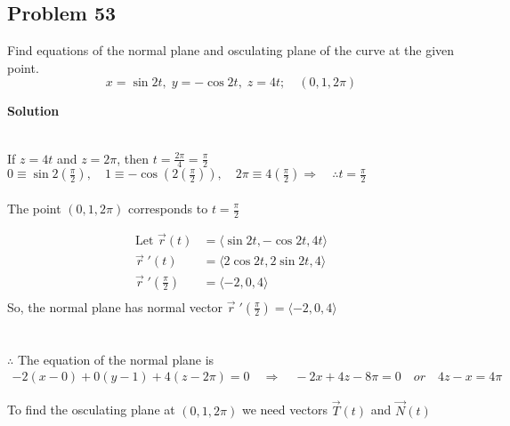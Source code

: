 \documentclass{article}
\newcommand\vv[1]{\langle #1 \rangle}
\newcommand\vc[2]{\vec{#1}(#2)}
\newcommand\vcd[2]{\vec{#1}\;'(#2)}
\newcommand\rr{\quad\Rightarrow\quad}
\begin{document}
\subsection*{Problem 53}

Find equations of the normal plane and osculating plane of the curve at the given point.
\[
    x = \sin{2t},\; y = -\cos{2t},\; z = 4t; \quad (0, 1, 2\pi)
\]

\centerline{\textbf{Solution}} \\
If $z = 4t$ and $z = 2\pi$, then $t = \frac{2\pi}{4} = \frac \pi 2$ \\
$0 \equiv \sin{2(\frac \pi 2)}, \quad 1 \equiv -\cos(2(\frac \pi 2)), \quad 2\pi \equiv 4(\frac \pi 2) \Rightarrow \quad \therefore t = \frac \pi 2$ \\
\\
The point $(0, 1, 2\pi)$ corresponds to $t=\frac \pi 2$

\begin{align*}
\text{Let }\vc r t &= \vv{\sin 2t, -\cos 2t, 4t} \\
    \vcd r t &= \vv{2\cos 2t, 2\sin 2t, 4} \\
    \vcd {r}{\frac \pi 2} &= \vv{-2, 0, 4} \\
\end{align*}
So, the normal plane has normal vector $\vcd {r}{\frac \pi 2} = \vv{-2, 0, 4}$ \\ \\
\\

$\therefore$ The equation of the normal plane is
\begin{align*}
    -2(x-0)+0(y-1)+4(z-2\pi) = 0 \rr -2x + 4z - 8\pi = 0 \quad or \quad 4z - x = 4\pi
\end{align*}

To find the osculating plane at $(0, 1, 2\pi)$ we need vectors $\vc T t$ and $\vc N t$
\end{document}
